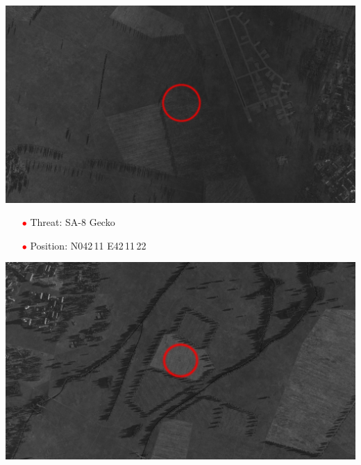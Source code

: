 \documentclass[a4paper,12pt,dvipsnames]{letter}
\newcommand{\myHead}[1]{{\LARGE\textsc{\textbf{#1}}}}
\newcommand{\ri}{\textcolor{Red}{$\bullet$\;}}
\begin{document}
{%
\begin{center}
\includegraphics[width=0.7\linewidth]{../gimp/SA15_Sat.png}
\end{center}
%
\begin{itemize}
 \item[\ri] Threat: SA-8 Gecko
 \item[\ri] Position: N042\,11 E42\,11\,22 
\end{itemize}
%
\begin{center}
\includegraphics[width=0.7\linewidth]{../gimp/SA8_Sat.png}
\end{center}
%
%
%
}
\end{document}
